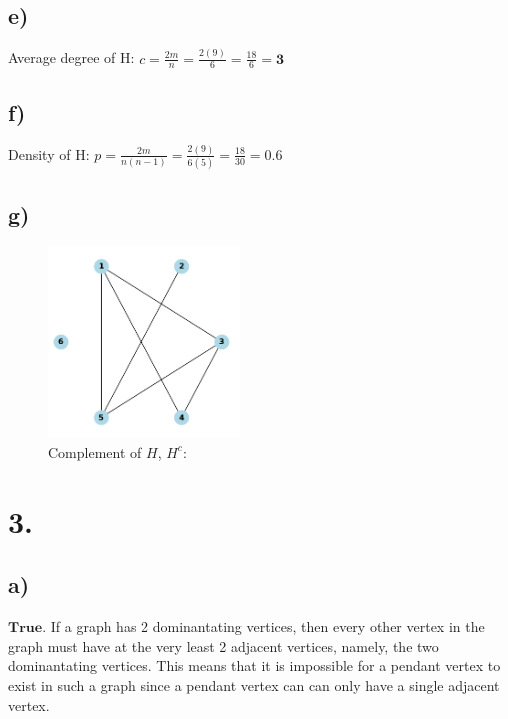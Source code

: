 \documentclass{article}
\begin{document}
        \subsection*{e)}
            \begin{minipage}[t]{1\textwidth}
                Average degree of H: $c = \frac{2m}{n} = \frac{2(9)}{6} = \frac{18}{6} = \mathbf{3}$
            \end{minipage}%
            
        \subsection*{f)}
            \begin{minipage}[t]{1\textwidth}
                Density of H: $p = \frac{2m}{n(n-1)} = \frac{2(9)}{6(5)} = \frac{18}{30} = \mathbf{0.6}$
            \end{minipage}%
        
        \newpage
        \subsection*{g)}
            \begin{figure}[ht] %
                \begin{minipage}[t]{0.5\textwidth}
                    \centering
                    \captionsetup{labelformat=empty} %
                    \caption{Complement of $H$, $H^{c}$:}
                    \includegraphics[width=2in]{undirected_complement.png}
                \end{minipage}%
            \end{figure}
    
    \section*{3.}
        \subsection*{a)}
            \begin{minipage}[t]{1\textwidth}
                $\mathbf{True}$. If a graph has 2 dominantating vertices, then every other vertex in the graph must
                have at the very least 2 adjacent vertices, namely, the two dominantating vertices. This means
                that it is impossible for a pendant vertex to exist in such a graph since a pendant vertex can
                can only have a single adjacent vertex.
            \end{minipage}
\end{document}
